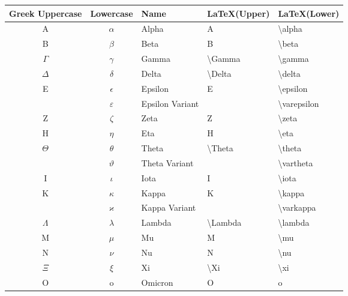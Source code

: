 \begin{table}[!htb]
\begin{tabularx}{\linewidth}{ c c l l l } \hline
  Greek Uppercase & Lowercase & Name  & \LaTeX (Upper)       & \LaTeX (Lower) \\
  \hline
  A               & $\alpha$   & Alpha   & A                     & \textbackslash alpha \\
  B               & $\beta$    & Beta    & B                     & \textbackslash beta \\
  $\Gamma$        & $\gamma$   & Gamma   & \textbackslash Gamma  & \textbackslash gamma \\
  $\Delta$        & $\delta$   & Delta   & \textbackslash Delta  & \textbackslash delta \\
  E               & $\epsilon$ & Epsilon & E                     & \textbackslash epsilon \\
                  & $\varepsilon$ & Epsilon Variant &            & \textbackslash varepsilon \\
  Z               & $\zeta$    & Zeta    & Z                     & \textbackslash zeta \\
  H               & $\eta$     & Eta     & H                     & \textbackslash eta \\
  $\Theta$        & $\theta$   & Theta   & \textbackslash Theta  & \textbackslash theta \\
                  & $\vartheta$ & Theta Variant &                  & \textbackslash vartheta \\
  I               & $\iota$    & Iota    & I                     & \textbackslash iota \\
  K               & $\kappa$   & Kappa   & K                     & \textbackslash kappa \\
                  & $\varkappa$ & Kappa Variant &                  & \textbackslash varkappa \\
  $\Lambda$       & $\lambda$  & Lambda  & \textbackslash Lambda & \textbackslash lambda \\
  M               & $\mu$      & Mu      & M                     & \textbackslash mu \\
  N               & $\nu$      & Nu      & N                     & \textbackslash nu \\
  $\Xi$           & $\xi$      & Xi      & \textbackslash Xi     & \textbackslash xi \\
  O               & o          & Omicron & O                     & o \\

\end{tabularx}
\end{table}
